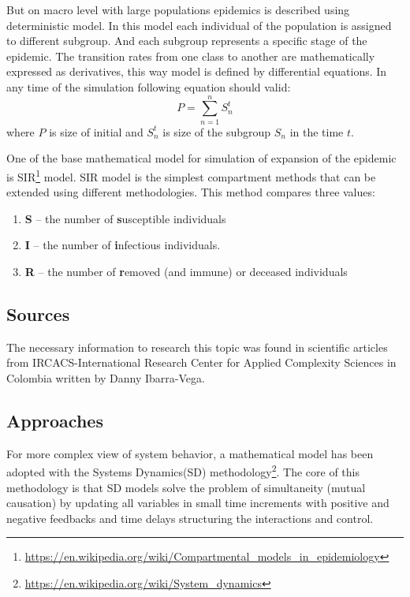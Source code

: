 \documentclass[12pt,a4paper,english]{article}
\begin{document}
    But on macro level with large populations epidemics is described using deterministic model.
    In this model each individual of the population is assigned to different subgroup.
    And each subgroup represents a specific stage of the epidemic.
    The transition rates from one class to another are mathematically expressed as derivatives, this way model is defined by differential equations.
    In any time of the simulation following equation should valid:
    $$P = \sum_{n = 1}^{n} S^t_n$$
    where $P$ is size of initial and $S^t_n$ is size of the subgroup $S_n$ in the time $t$. 

    One of the base mathematical model for simulation of expansion of the epidemic is SIR\footnote{\href{https://en.wikipedia.org/wiki/Compartmental\_models\_in\_epidemiology}{https://en.wikipedia.org/wiki/Compartmental\_models\_in\_epidemiology}} model. 
    SIR model is the simplest compartment methods that can be extended using different methodologies.
    This method compares three values:
    \begin{enumerate}
        \item \textbf{S} -- the number of \textbf{s}usceptible individuals
        \item \textbf{I} -- the number of \textbf{i}nfectious individuals.
        \item \textbf{R} -- the number of \textbf{r}emoved (and immune) or deceased individuals
    \end{enumerate} 

    \subsection{Sources}
    The necessary information to research this topic was found in scientific articles from IRCACS-International Research Center for Applied Complexity Sciences in  Colombia written by Danny Ibarra-Vega\cite{math_article}.

    \subsection{Approaches}
    For more complex view of system behavior, a mathematical model has been adopted with the Systems Dynamics(SD) methodology\footnote{\href{https://en.wikipedia.org/wiki/System\_dynamics}{https://en.wikipedia.org/wiki/System\_dynamics}}.
    The core of this methodology is that SD models solve the problem of simultaneity (mutual causation) by updating all variables in small time increments with positive and negative feedbacks and time delays structuring the interactions and control.
    
\end{document}
